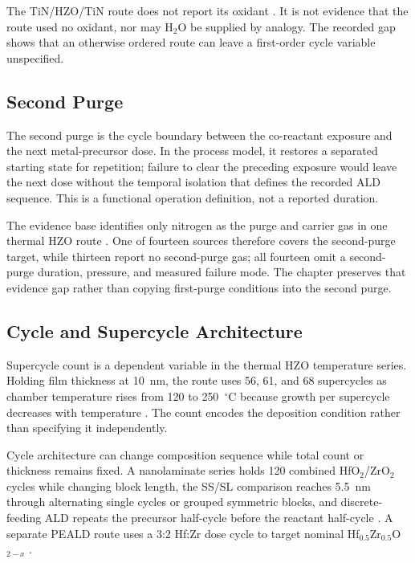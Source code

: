 \documentclass[11pt,a4paper]{report}
\begin{document}
The TiN/HZO/TiN route does not report its oxidant \cite{tsai2022stress}. It is not evidence that the route used no oxidant, nor may H$_2$O be supplied by analogy. The recorded gap shows that an otherwise ordered route can leave a first-order cycle variable unspecified.

\subsection{Second Purge}
\label{sec:ald-second-purge}

The second purge is the cycle boundary between the co-reactant exposure and the next metal-precursor dose. In the process model, it restores a separated starting state for repetition; failure to clear the preceding exposure would leave the next dose without the temporal isolation that defines the recorded ALD sequence. This is a functional operation definition, not a reported duration.

The evidence base identifies only nitrogen as the purge and carrier gas in one thermal HZO route \cite{zhang2015inductive}. One of fourteen sources therefore covers the second-purge target, while thirteen report no second-purge gas; all fourteen omit a second-purge duration, pressure, and measured failure mode. The chapter preserves that evidence gap rather than copying first-purge conditions into the second purge.

\subsection{Cycle and Supercycle Architecture}
\label{sec:ald-cycle-architecture}

Supercycle count is a dependent variable in the thermal HZO temperature series. Holding film thickness at 10~nm, the route uses 56, 61, and 68 supercycles as chamber temperature rises from 120 to 250~$^\circ$C because growth per supercycle decreases with temperature \cite{choi2022chamber}. The count encodes the deposition condition rather than specifying it independently.

Cycle architecture can change composition sequence while total count or thickness remains fixed. A nanolaminate series holds 120 combined HfO$_2$/ZrO$_2$ cycles while changing block length, the SS/SL comparison reaches 5.5~nm through alternating single cycles or grouped symmetric blocks, and discrete-feeding ALD repeats the precursor half-cycle before the reactant half-cycle \cite{silva2023road,song2023seed,kaatranen2026unif}. A separate PEALD route uses a 3:2 Hf:Zr dose cycle to target nominal Hf$_{0.5}$Zr$_{0.5}$O$_{2-x}$ \cite{choi2025purge}.
\end{document}
